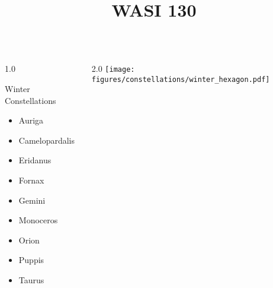 \documentclass[final]{beamer}
\title{WASI 130}
\newlength{\colwidth}
\begin{document}
\begin{frame}[t]{}
  \begin{columns}[T]
    \begin{column}{1.0\colwidth}
      \Large
      \begin{block}{Winter Constellations}
        \begin{itemize}
          \item{Auriga}
          \item{Camelopardalis}
          \item{Eridanus}
          \item{Fornax}
          \item{Gemini}
          \item{Monoceros}
          \item{Orion}
          \item{Puppis}
          \item{Taurus}
        \end{itemize}
      \end{block}
    \end{column}
    \begin{column}{2.0\colwidth}
      \centering
      \texttt{[image: figures/constellations/winter\_hexagon.pdf]}
    \end{column}
  \end{columns}
\end{frame}

\end{document}
